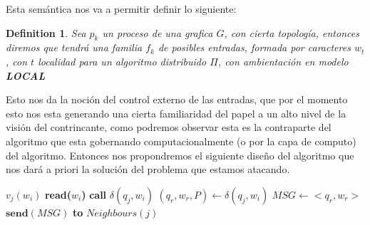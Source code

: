 \documentclass[10pt]{report}
\newtheorem{definition}{Definition}
\begin{document}
    Esta semántica nos va a permitir definir lo siguiente:
    \theoremstyle{definition}
    \begin{definition}
        Sea $p_{k}$ un proceso de una grafica $G$, con cierta topología, entonces
        diremos que tendrá una familia $f_{k}$ de posibles entradas, formada por caracteres $w_{t}$, con $t$ localidad para un algoritmo
        distribuido $\Pi$, con ambientación en modelo \textbf{LOCAL}

    \end{definition}
    Esto nos da la noción del control externo de las entradas, que por el momento esto nos esta generando
    una cierta familiaridad del papel a un alto nivel de la visión del contrincante, como podremos observar
    esta es la contraparte del algoritmo que esta gobernando computacionalmente (o por la capa de computo)
    del algoritmo.
    \space
    Entonces nos propondremos el siguiente diseño del algoritmo que nos dará a priori
    la solución del problema que estamos atacando.

    \begin{algorithm}
        \caption{$Simula\char95Algo\char95TM(w)$}\label{alg:simula}
        \begin{algorithmic}
                  \STATE $v_{j}(w_{i})$
                  \STATE \textbf{read($w_{i}$)}
                     \STATE \textbf{call} $\delta(q_{j},w_{i})$
                     \STATE $(q_{r},w_{r},P)\gets \delta(q_{j},w_{i})$
                  \ENDWHILE
                  \ENDIF
                  \ELSE
                       \STATE $MSG\gets<q_{r},w_{r}>$
                       \STATE $\textbf{send}(MSG)$ \textbf{to} $Neighbours(j)$ 
               \ENDFOR
        \end{algorithmic}
    \end{algorithm}
    \space
\end{document}
